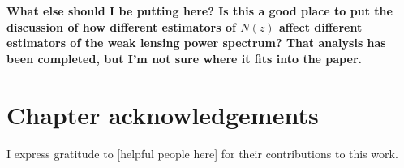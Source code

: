 \textbf{What else should I be putting here?  Is this a good place to put the discussion of how different estimators of $N(z)$ affect different estimators of the weak lensing power spectrum?  That analysis has been completed, but I'm not sure where it fits into the paper.}

\section{Chapter acknowledgements}

I express gratitude to
[helpful people here]
for their contributions to this work.
